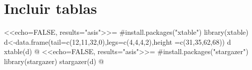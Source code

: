 \documentclass{article}
\begin{document}
\section{Incluir tablas}
<<echo=FALSE, results="asis">>=
#install.packages("xtable")
library(xtable)
d<-data.frame(tail=c(12,11,32,0),legs=c(4,4,4,2),height =c(31,35,62,68))
d
xtable(d)
@
<<echo=FALSE, results="asis">>=
#install.packages("stargazer")
library(stargazer)
stargazer(d)
@
\end{document}
